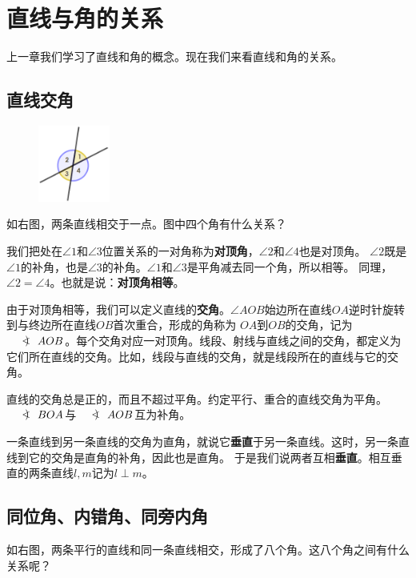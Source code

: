 \documentclass[12pt,UTF8]{ctexbook}
\newcommand{\arcangle}{\mathord{\mathpalette\doarcangle\relax}}
\newcommand{\doarcangle}[2]{%
  \hbox{%
    \sbox0{$#1B$}%
    \sbox2{$#1<$}%
    \raisebox{\dimexpr\dp0+(\ht0-\ht2)/2}{%
      $#1<\mspace{-9mu}\mathrel{)}\mspace{2mu}$%
    }%
  }%
}
\begin{document}
\chapter{直线与角的关系}
上一章我们学习了直线和角的概念。现在我们来看直线和角的关系。

\section{直线交角}
\begin{figure} %
    \vspace{-15pt}
    \includegraphics[width=0.21\textwidth]{角度0.png}
\end{figure}

如右图，两条直线相交于一点。图中四个角有什么关系？

我们把处在$\angle 1$和$\angle 3$位置关系的一对角称为\textbf{对顶角}，$\angle 2$和$\angle 4$也是对顶角。
$\angle 2$既是$\angle 1$的补角，也是$\angle 3$的补角。$\angle 1$和$\angle 3$是平角减去同一个角，所以相等。
同理，$\angle 2 = \angle 4$。也就是说：\textbf{对顶角相等}。

由于对顶角相等，我们可以定义直线的\textbf{交角}。$\angle AOB$始边所在直线$OA$逆时针旋转到与终边所在直线$OB$首次重合，形成的角称为
$OA$到$OB$的交角，记为$\arcangle AOB$。每个交角对应一对顶角。线段、射线与直线之间的交角，都定义为它们所在直线的交角。比如，线段与直线的交角，就是线段所在的直线与它的交角。

直线的交角总是正的，而且不超过平角。约定平行、重合的直线交角为平角。$\arcangle BOA$与$\arcangle AOB$互为补角。

一条直线到另一条直线的交角为直角，就说它\textbf{垂直}于另一条直线。这时，另一条直线到它的交角是直角的补角，因此也是直角。
于是我们说两者互相\textbf{垂直}。相互垂直的两条直线$l,m$记为$l\perp m$。


\section{同位角、内错角、同旁内角}
如右图，两条平行的直线和同一条直线相交，形成了八个角。这八个角之间有什么关系呢？
\end{document}
